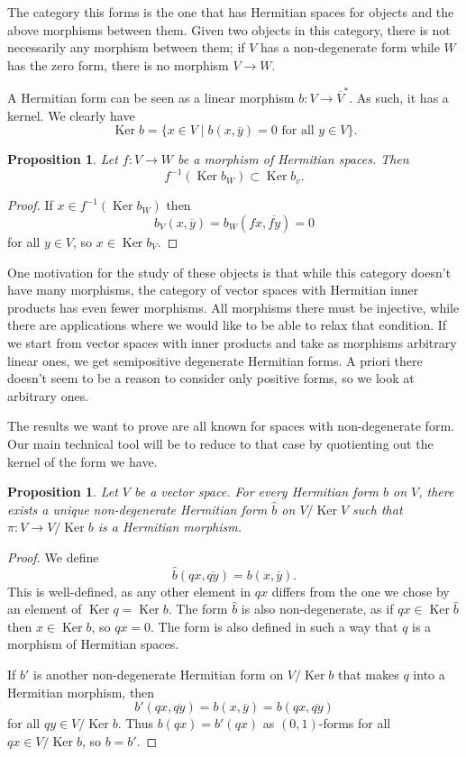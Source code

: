 \documentclass[10pt,a4paper]{article}
\newtheorem{prop}[theo]{Proposition}
\newtheorem*{proof}{Proof}
\def\ov#1{\overline{#1}}
\DeclareMathOperator{\Ker}{Ker}
\begin{document}
The category this forms is the one that has Hermitian spaces for objects and the above morphisms between them. Given two objects in this category, there is not necessarily any morphism between them; if $V$ has a non-degenerate form while $W$ has the zero form, there is no morphism $V \to W$.

A Hermitian form can be seen as a linear morphism $b : V \to \ov V^*$. As such, it has a kernel. We clearly have
\[
\Ker b = \{ x \in V \mid b(x, \ov y) = 0 \text{ for all $y \in V$}\}.
\]

\begin{prop}
Let $f : V \to W$ be a morphism of Hermitian spaces. Then
\[
f^{-1}(\Ker b_W) \subset \Ker b_v.
\]
\end{prop}

\begin{proof}
If $x \in f^{-1}(\Ker b_W)$ then
\[
b_V(x, \ov y) = b_W(fx, \ov{fy}) = 0
\]
for all $y \in V$, so $x \in \Ker b_V$.
\end{proof}

One motivation for the study of these objects is that while this category doesn't have many morphisms, the category of vector spaces with Hermitian inner products has even fewer morphisms. All morphisms there must be injective, while there are applications where we would like to be able to relax that condition. If we start from vector spaces with inner products and take as morphisms arbitrary linear ones, we get semipositive degenerate Hermitian forms. A priori there doesn't seem to be a reason to consider only positive forms, so we look at arbitrary ones.



The results we want to prove are all known for spaces with non-degenerate form. Our main technical tool will be to reduce to that case by quotienting out the kernel of the form we have.

\begin{prop}
Let $V$ be a vector space. For every Hermitian form $b$ on $V$, there exists a unique non-degenerate Hermitian form $\hat b$ on $V / \Ker V$ such that $\pi : V \to V/\Ker b$ is a Hermitian morphism.
\end{prop}


\begin{proof}
We define
\[
\hat b(qx, \ov{qy})
= b(x, \ov y).
\]
This is well-defined, as any other element in $qx$ differs from the one we chose by an element of $\Ker q = \Ker b$. The form $\hat b$ is also non-degenerate, as if $qx \in \Ker \hat b$ then $x \in \Ker b$, so $qx = 0$. The form is also defined in such a way that $q$ is a morphism of Hermitian spaces.

If $b'$ is another non-degenerate Hermitian form on $V / \Ker b$ that makes $q$ into a Hermitian morphism, then
\[
b'(qx, \ov{qy})
= b(x, \ov{y})
= b(qx, \ov{qy})
\]
for all $qy \in V / \Ker b$. Thus $b(qx) = b'(qx)$ as $(0,1)$-forms for all $qx \in V / \Ker b$, so $b = b'$.
\end{proof}
\end{document}
